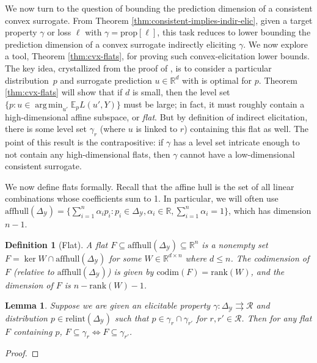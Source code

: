 \documentclass{article}
\newcommand{\reals}{\mathbb{R}}
\newcommand{\simplex}{\Delta_\Y}
\newcommand{\relint}[1]{\mathrm{relint}(#1)}
\newcommand{\prop}[1]{\mathrm{prop}[#1]}
\newcommand{\codim}{\mathrm{codim}}
\newcommand{\affhull}{\mathrm{affhull}}
\newcommand{\E}{\mathbb{E}}
\newcommand{\R}{\mathcal{R}}
\newcommand{\Y}{\mathcal{Y}}
\newcommand{\exploss}[3]{\E_{#3} #1(#2,Y)}
\newcommand{\toto}{\rightrightarrows}
\newtheorem{lemma}{Lemma}
\newtheorem{definition}{Definition}
\DeclareMathOperator*{\argmin}{arg\,min}
\begin{document}
We now turn to the question of bounding the prediction dimension of a consistent convex surrogate.
From Theorem \ref{thm:consistent-implies-indir-elic}, given a target property $\gamma$ or loss $\ell$ with $\gamma = \prop{\ell}$, this task reduces to lower bounding the prediction dimension of a convex surrogate indirectly eliciting $\gamma$.
We now explore a tool, Theorem \ref{thm:cvx-flats}, for proving such convex-elicitation lower bounds.
The key idea, crystallized from the proof of \citet[Theorem 16]{ramaswamy2016convex}, is to consider a particular distribution~$p$ and surrogate prediction $u \in \reals^d$ with is optimal for $p$.
Theorem \ref{thm:cvx-flats} will show that if $d$ is small, then the level set $\{p : u \in \argmin_{u'} \exploss{L}{u'}{p}\}$ must be large; in fact, it must roughly contain a high-dimensional affine subspace, or \emph{flat}.
But by definition of indirect elicitation, there is some level set $\gamma_r$ (where $u$ is linked to $r$) containing this flat as well.
The point of this result is the contrapositive: if $\gamma$ has a level set intricate enough to not contain any high-dimensional flats, then $\gamma$ cannot have a low-dimensional consistent surrogate.

We now define flats formally.
Recall that the affine hull is the set of all linear combinations whose coefficients sum to 1.
In particular, we will often use $\affhull(\simplex) = \{\sum_{i=1}^n \alpha_i p_i : p_i \in \simplex, \alpha_i \in \reals, \sum_{i=1}^n \alpha_i = 1\}$, which has dimension $n-1$.
\begin{definition}[Flat]
	A \emph{flat} $F \subseteq \affhull(\simplex) \subseteq \reals^n$ is a nonempty set $F = \ker W \cap \affhull(\simplex)$ for some $W\in\reals^{d\times n}$ where $d\leq n$.
	The codimension of $F$ (relative to $\affhull(\simplex)$) is given by $\codim(F)=\mathrm{rank}(W)$, and the dimension of $F$ is $n - \mathrm{rank}(W) - 1$.
\end{definition}

\begin{lemma}\label{lem:set-valued-prop-flats}
	Suppose we are given an elicitable property $\gamma : \simplex \toto \R$ and distribution $p \in \relint\simplex$ such that $p \in \gamma_r \cap \gamma_{r'}$ for $r,r' \in \R$.
	Then for any flat $F$ containing $p$, $F \subseteq \gamma_r \iff F \subseteq \gamma_{r'}$.
\end{lemma}
\begin{proof}
	
\end{proof}
\end{document}
